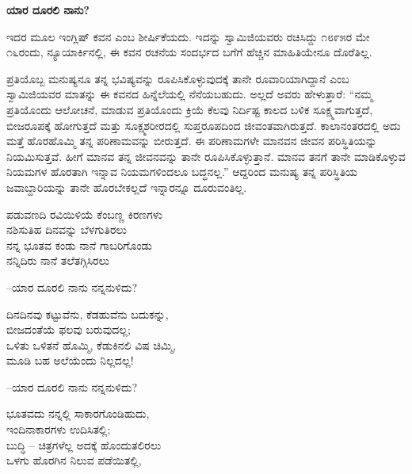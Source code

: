 \begin{center}
\textbf{ಯಾರ ದೂರಲಿ ನಾನು?}
\end{center}

ಇದರ ಮೂಲ ಇಂಗ್ಲಿಷ್ ಕವನ  ಎಂಬ ಶೀರ್ಷಿಕೆಯದು. ಇದನ್ನು ಸ್ವಾಮಿಜಿಯವರು ರಚಿಸಿದ್ದು ೧೮೯೫ರ ಮೇ ೧೬ರಂದು, ನ್ಯೂಯಾರ್ಕಿನಲ್ಲಿ, ಈ ಕವನ ರಚನೆಯ ಸಂದರ್ಭದ ಬಗೆಗೆ ಹೆಚ್ಚಿನ ಮಾಹಿತಿಯೇನೂ ದೊರೆತಿಲ್ಲ.

ಪ್ರತಿಯೊಬ್ಬ ಮನುಷ್ಯನೂ ತನ್ನ ಭವಿಷ್ಯವನ್ನು ರೂಪಿಸಿಕೊಳ್ಳುವುದಕ್ಕೆ ತಾನೇ ರೂವಾರಿಯಾಗಿದ್ದಾನೆ ಎಂಬ ಸ್ವಾಮಿಜಿಯವರ ಮಾತನ್ನು ಈ ಕವನದ ಹಿನ್ನೆಲೆಯಲ್ಲಿ ನೆನೆಯಬಹುದು. ಅಲ್ಲದೆ ಅವರು ಹೇಳುತ್ತಾರೆ: “ನಮ್ಮ ಪ್ರತಿಯೊಂದು ಆಲೋಚನೆ, ಮಾಡುವ ಪ್ರತಿಯೊಂದು ಕ್ರಿಯೆ ಕೆಲವು ನಿರ್ದಿಷ್ಟ ಕಾಲದ ಬಳಿಕ ಸೂಕ್ಷ್ಮವಾಗುತ್ತದೆ, ಬೀಜರೂಪಕ್ಕೆ ಹೋಗುತ್ತದೆ ಮತ್ತು ಸೂಕ್ಷ್ಮಶರೀರದಲ್ಲಿ ಸುಪ್ತರೂಪದಿಂದ ಜೀವಂತವಾಗಿರುತ್ತದೆ. ಕಾಲಾನಂತರದಲ್ಲಿ ಅದು ಮತ್ತೆ ಹೊರಹೊಮ್ಮಿ ತನ್ನ ಪರಿಣಾಮವನ್ನು ಬೀರುತ್ತದೆ. ಈ ಪರಿಣಾಮಗಳೇ ಮಾನವನ ಜೀವನ ಪರಿಸ್ಥಿತಿಯನ್ನು ನಿಯಮಿಸುತ್ತವೆ. ಹೀಗೆ ಮಾನವ ತನ್ನ ಜೀವನವನ್ನು ತಾನೇ ರೂಪಿಸಿಕೊಳ್ಳುತ್ತಾನೆ. ಮಾನವ ತನಗೆ ತಾನೇ ಮಾಡಿಕೊಳ್ಳುವ ನಿಯಮಗಳ ಹೊರತಾಗಿ ಇನ್ನಾವ ನಿಯಮಗಳಿಂದಲೂ ಬದ್ಧನಲ್ಲ.” ಆದ್ದರಿಂದ ಮನುಷ್ಯ ತನ್ನ ಪರಿಸ್ಥಿತಿಯ ಜವಾಬ್ದಾರಿಯನ್ನು ತಾನೇ ಹೊರಬೇಕಲ್ಲದೆ ಇನ್ನಾರನ್ನೂ ದೂರುವಂತಿಲ್ಲ.

\begin{myquote}
ಪಡುವಣದಿ ರವಿಯಿಳಿಯೆ ಕೆಂಬಣ್ಣ ಕಿರಣಗಳು\\ನಶಿಸುತಿಹ ದಿನವನ್ನು ಬೆಳಗುತಿರಲು\\ನನ್ನ ಭೂತವ ಕಂಡು ನಾನೆ ಗಾಬರಿಗೊಂಡು\\ನನ್ನಿದಿರು ನಾನೆ ತಲೆತಗ್ಗಿಸಿರಲು
\end{myquote}

\begin{flushright}
–ಯಾರ ದೂರಲಿ ನಾನು ನನ್ನನುಳಿದು?
\end{flushright}

\begin{myquote}
ದಿನದಿನವು ಕಟ್ಟುವೆನು, ಕೆಡಹುವೆನು ಬದುಕನ್ನು,\\ಬೀಜದಂತೆಯೆ ಫಲವು ಬರುವುದಲ್ಲ;\\ಒಳಿತು ಒಳಿತನೆ ಹೊಮ್ಮಿ, ಕೆಡುಕಿನಲಿ ವಿಷ ಚಿಮ್ಮಿ,\\ಮೂಡಿ ಬಹ ಅಲೆಯೆಂದು ನಿಲ್ಲದಲ್ಲ!
\end{myquote}

\begin{flushright}
–ಯಾರ ದೂರಲಿ ನಾನು ನನ್ನನುಳಿದು?
\end{flushright}

\begin{myquote}
ಭೂತವದು ನನ್ನಲ್ಲಿ ಸಾಕಾರಗೊಂಡಿಹುದು,\\ಇಂದಿನಾಕಾರಗಳು ಉದಿಸಿತಲ್ಲಿ;\\ಬುದ್ಧಿ – ಚಿತ್ರಗಳೆಲ್ಲ ಅದಕ್ಕೆ ಹೊಂದುತಲಿರಲು\\ಒಳಗು ಹೊರಗಿನ ನಿಲುವ ಪಡೆಯಿತಲ್ಲಿ,
\end{myquote}

